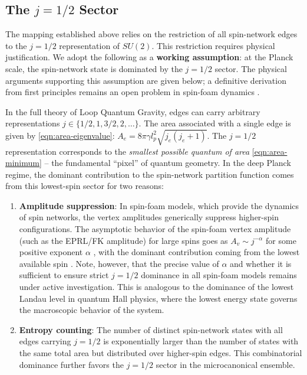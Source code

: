 \subsection{The $ j = 1/2 $ Sector}\label{subsec:j-half-dominance}

The mapping established above relies on the restriction of all spin-network edges to the $ j = 1/2 $ representation of $ SU(2) $. This restriction requires physical justification. We adopt the following as a \textbf{working assumption}: at the Planck scale, the spin-network state is dominated by the $ j = 1/2 $ sector. The physical arguments supporting this assumption are given below; a definitive derivation from first principles remains an open problem in spin-foam dynamics \cite{Dona2020Numerical,Dona2022Asymptotics}.

In the full theory of Loop Quantum Gravity, edges can carry arbitrary representations $ j \in \{1/2, 1, 3/2, 2, \ldots \} $. The area associated with a single edge is given by \eqref{eqn:area-eigenvalue}: $ A_e = 8\pi\gamma l_p^2 \sqrt{j_e(j_e + 1)} $. The $ j = 1/2 $ representation corresponds to the \emph{smallest possible quantum of area} \eqref{eqn:area-minimum} -- the fundamental ``pixel'' of quantum geometry. In the deep Planck regime, the dominant contribution to the spin-network partition function comes from this lowest-spin sector for two reasons:

\begin{enumerate}
	\item \textbf{Amplitude suppression}: In spin-foam models, which provide the dynamics of spin networks, the vertex amplitudes generically suppress higher-spin configurations. The asymptotic behavior of the spin-foam vertex amplitude (such as the EPRL/FK amplitude) for large spins goes as $ A_v \sim j^{-\alpha} $ for some positive exponent $ \alpha $ \cite{Dona2020Numerical,Dona2022Asymptotics}, with the dominant contribution coming from the lowest available spin \cite{Perez2013The-Spin-Foam}. Note, however, that the precise value of $ \alpha $ and whether it is sufficient to ensure strict $ j = 1/2 $ dominance in all spin-foam models remains under active investigation. This is analogous to the dominance of the lowest Landau level in quantum Hall physics, where the lowest energy state governs the macroscopic behavior of the system.

	\item \textbf{Entropy counting}: The number of distinct spin-network states with all edges carrying $ j = 1/2 $ is exponentially larger than the number of states with the same total area but distributed over higher-spin edges. This combinatorial dominance further favors the $ j = 1/2 $ sector in the microcanonical ensemble.
\end{enumerate}

